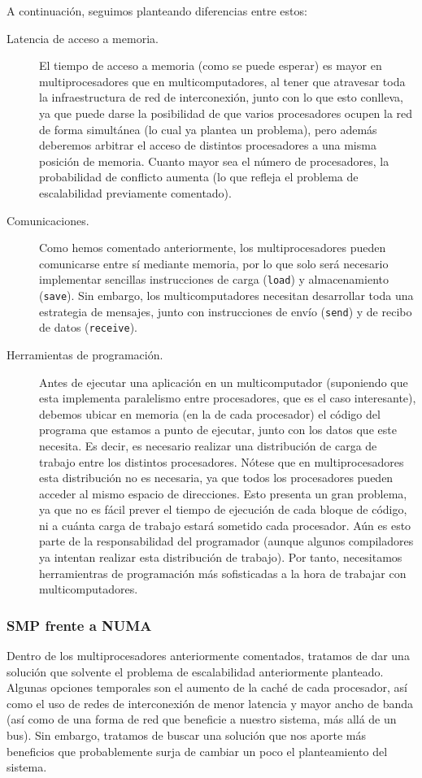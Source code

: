 A continuación, seguimos planteando diferencias entre estos:
\begin{description}
    \item [Latencia de acceso a memoria.]
        El tiempo de acceso a memoria (como se puede esperar) es mayor en multiprocesadores que en multicomputadores, al tener que atravesar toda la infraestructura de red de interconexión, junto con lo que esto conlleva, ya que puede darse la posibilidad de que varios procesadores ocupen la red de forma simultánea (lo cual ya plantea un problema), pero además deberemos arbitrar el acceso de distintos procesadores a una misma posición de memoria. Cuanto mayor sea el número de procesadores, la probabilidad de conflicto aumenta (lo que refleja el problema de escalabilidad previamente comentado). 
    \item [Comunicaciones.]
        Como hemos comentado anteriormente, los multiprocesadores pueden comunicarse entre sí mediante memoria, por lo que solo será necesario implementar sencillas instrucciones de carga (\verb|load|) y almacenamiento (\verb|save|). Sin embargo, los multicomputadores necesitan desarrollar toda una estrategia de mensajes, junto con instrucciones de envío (\verb|send|) y de recibo de datos (\verb|receive|). 
    \item [Herramientas de programación.]
        Antes de ejecutar una aplicación en un multicomputador (suponiendo que esta implementa paralelismo entre procesadores, que es el caso interesante), debemos ubicar en memoria (en la de cada procesador) el código del programa que estamos a punto de ejecutar, junto con los datos que este necesita. Es decir, es necesario realizar una distribución de carga de trabajo entre los distintos procesadores. Nótese que en multiprocesadores esta distribución no es necesaria, ya que todos los procesadores pueden acceder al mismo espacio de direcciones. Esto presenta un gran problema, ya que no es fácil prever el tiempo de ejecución de cada bloque de código, ni a cuánta carga de trabajo estará sometido cada procesador. Aún es esto parte de la responsabilidad del programador (aunque algunos compiladores ya intentan realizar esta distribución de trabajo). Por tanto, necesitamos herramientras de programación más sofisticadas a la hora de trabajar con multicomputadores.
\end{description}

\subsubsection{SMP frente a NUMA}
Dentro de los multiprocesadores anteriormente comentados, tratamos de dar una solución que solvente el problema de escalabilidad anteriormente planteado. Algunas opciones temporales son el aumento de la caché de cada procesador, así como el uso de redes de interconexión de menor latencia y mayor ancho de banda (así como de una forma de red que beneficie a nuestro sistema, más allá de un bus). Sin embargo, tratamos de buscar una solución que nos aporte más beneficios que probablemente surja de cambiar un poco el planteamiento del sistema.

